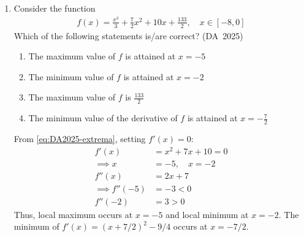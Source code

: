 \begin{enumerate}[label=\thesubsection.\arabic*, ref=\thesubsection.\theenumi]
\item Consider the function
\begin{align}
	f(x) = \frac{x^3}{3} + \frac{7}{2}x^2 + 10x + \frac{133}{2}, \quad x \in [-8, 0] \label{eq:DA-2025-33-1}
\end{align}
Which of the following statements is/are correct?
\hfill (DA~2025)
\begin{enumerate}
		\item The maximum value of $f$ is attained at $x = -5$
		\item The minimum value of $f$ is attained at $x = -2$
		\item The maximum value of $f$ is $\frac{133}{2}$
		\item The minimum value of the derivative of $f$ is attained at $x = -\frac{7}{2}$
\end{enumerate}
\solution From \eqref{eq:DA2025-extrema}, setting $f'(x) = 0$:
\begin{align}
	 f'(x) &= x^2 + 7x + 10 = 0 \label{eq:DA-2025-33-2}
	\\
	 \implies x &= -5, \quad x = -2 \label{eq:DA-2025-33-3}
	\\
	 f''(x) &= 2x + 7 \label{eq:DA-2025-33-4}
	\\
	 \implies f''(-5) &= -3 < 0 \label{eq:DA-2025-33-5}
	\\
	 f''(-2) &= 3 > 0 \label{eq:DA-2025-33-6}
\end{align}
Thus, local maximum occurs at $x = -5$ and local minimum at $x = -2$. The minimum of $f'(x) = (x + 7/2)^2 - 9/4$ occurs at $x = -7/2$.


\end{enumerate}

